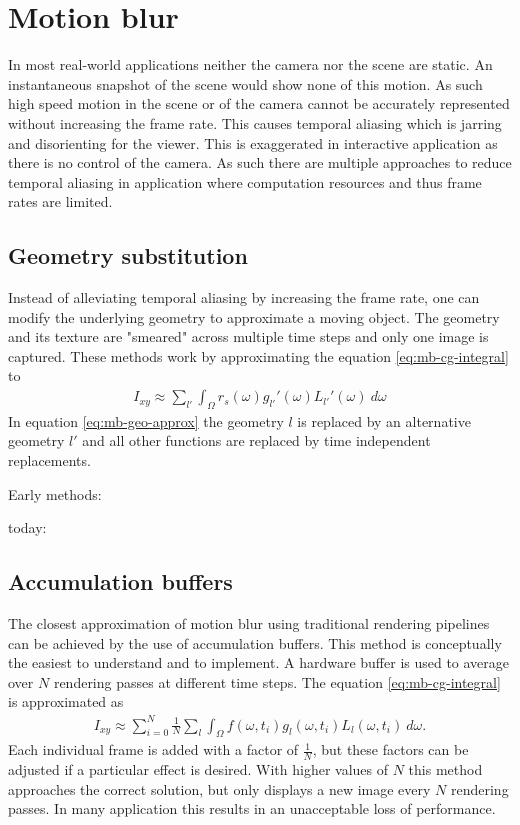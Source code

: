 \chapter{Motion blur}
In most real-world applications neither the camera nor the scene are static.
An instantaneous snapshot of the scene would show none of this motion.
As such high speed motion in the scene or of the camera cannot be accurately represented without increasing the frame rate.
This causes temporal aliasing which is jarring and disorienting for the viewer.
This is exaggerated in interactive application as there is no control of the camera.
As such there are multiple approaches to reduce temporal aliasing in application where computation resources and thus frame rates are limited.

\section{Geometry substitution}
Instead of alleviating temporal aliasing by increasing the frame rate, one can modify the underlying geometry to approximate a moving object.
The geometry and its texture are "smeared" across multiple time steps and only one image is captured.
These methods work by approximating the equation \ref{eq:mb-cg-integral} to 
\begin{align}
    I_{xy} \approx \sum_{l'} \int_\Omega r_s(\omega)g_{l'}'(\omega)L_{l'}'(\omega) \: d\omega
    \label{eq:mb-geo-approx}
\end{align}
In equation \ref{eq:mb-geo-approx} the geometry $l$ is replaced by an alternative geometry $l'$ and all other functions are replaced by time independent replacements.

Early methods: \cite{Wloka.1996}

today: \cite{Schmid.2010}

\section{Accumulation buffers}
The closest approximation of motion blur using traditional rendering pipelines can be achieved by the use of accumulation buffers.
This method is conceptually the easiest to understand and to implement.
A hardware buffer is used to average over $N$ rendering passes at different time steps.
The equation \ref{eq:mb-cg-integral} is approximated as
\begin{align}
    I_{xy} \approx \sum_{i=0}^{N} \frac{1}{N} \sum_{l} \int_\Omega f(\omega, t_i) g_l(\omega, t_i) L_l(\omega, t_i) \: d\omega.
\end{align}
Each individual frame is added with a factor of $\frac{1}{N}$, but these factors can be adjusted if a particular effect is desired.
With higher values of $N$ this method approaches the correct solution, but only displays a new image every $N$ rendering passes.
In many application this results in an unacceptable loss of performance.\cite{Haeberli.1990}

